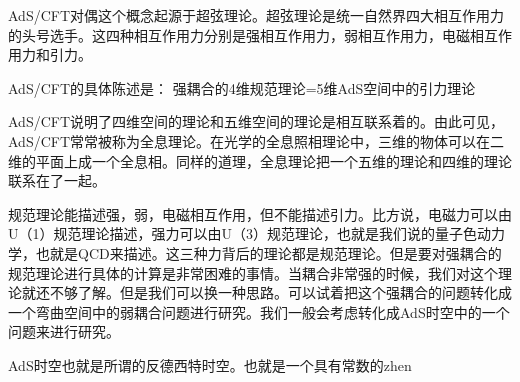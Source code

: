 
AdS/CFT对偶这个概念起源于超弦理论。超弦理论是统一自然界四大相互作用力的头号选手。这四种相互作用力分别是强相互作用力，弱相互作用力，电磁相互作用力和引力。

AdS/CFT的具体陈述是：
强耦合的4维规范理论=5维AdS空间中的引力理论

AdS/CFT说明了四维空间的理论和五维空间的理论是相互联系着的。由此可见，AdS/CFT常常被称为全息理论。在光学的全息照相理论中，三维的物体可以在二维的平面上成一个全息相。同样的道理，全息理论把一个五维的理论和四维的理论联系在了一起。

规范理论能描述强，弱，电磁相互作用，但不能描述引力。比方说，电磁力可以由U（1）规范理论描述，强力可以由U（3）规范理论，也就是我们说的量子色动力学，也就是QCD来描述。这三种力背后的理论都是规范理论。但是要对强耦合的规范理论进行具体的计算是非常困难的事情。当耦合非常强的时候，我们对这个理论就还不够了解。但是我们可以换一种思路。可以试着把这个强耦合的问题转化成一个弯曲空间中的弱耦合问题进行研究。我们一般会考虑转化成AdS时空中的一个问题来进行研究。

AdS时空也就是所谓的反德西特时空。也就是一个具有常数的zhen